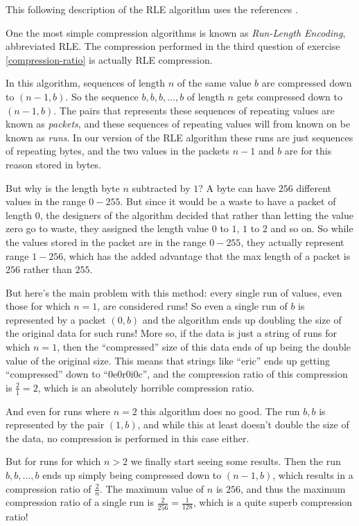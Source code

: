 This following description of the RLE algorithm uses the references
\cite{nagarajan11:_enhan_approac_run_lengt_encod_schem,murray1996encyclopedia,mark1996data_compression_book}.

One the most simple compression algorithms is known as
\textit{Run-Length Encoding}, abbreviated
RLE. The compression performed in the third question of
exercise \ref{compression-ratio} is actually RLE compression.

In this algorithm, sequences of length $n$ of the same value $b$ are
compressed down to $(n-1,b)$. So the sequence $b,b,b,...,b$ of length
$n$ gets compressed down to $(n-1,b)$. The pairs that represents these
sequences of repeating values are known as \textit{packets}, and these
sequences of repeating values will from known on be known as
\textit{runs}. In our version of the RLE algorithm these runs are just
sequences of repeating bytes, and the two values in the packets $n-1$
and $b$ are for this reason stored in bytes.

But why is the length byte $n$ subtracted by $1$?  A byte can have
$256$ different values in the range $0-255$. But since it would be a
waste to have a packet of length $0$, the designers of the algorithm
decided that rather than letting the value zero go to waste, they
assigned the length value $0$ to $1$, $1$ to $2$ and so on. So while
the values stored in the packet are in the range $0-255$, they
actually represent range $1-256$, which has the added advantage that
the max length of a packet is $256$ rather than $255$.

But here's the main problem with this method: every single run of
values, even those for which $n=1$, are considered runs! So even a
single run of $b$ is represented by a packet $(0,b)$ and the algorithm
ends up doubling the size of the original data for such runs! More so,
if the data is just a string of runs for which $n=1$, then the
``compressed'' size of this data ends of up being the double value of
the original size. This means that strings like ``eric'' ends up
getting ``compressed'' down to ``0e0r0i0c'', and the compression ratio
of this compression is $\frac{2}{1} = 2$, which is an absolutely
horrible compression ratio.

And even for runs where $n=2$ this algorithm does no good. The run
$b,b$ is represented by the pair $(1,b)$, and while this at least
doesn't double the size of the data, no compression is performed in
this case either.

But for runs for which $n > 2$ we finally start seeing some
results. Then the run $b, b, \dots, b$ ends up simply being compressed
down to $(n-1,b)$, which results in a compression ratio of
$\frac{2}{n}$. The maximum value of $n$ is $256$, and thus the maximum
compression ratio of a single run is $\frac{2}{256} = \frac{1}{128}$,
which is a quite superb compression ratio!

